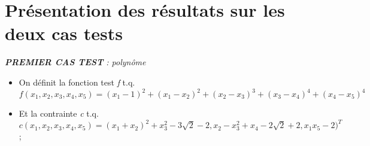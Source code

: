\section{Présentation des résultats sur les deux cas tests}

\begin{center} \emph{\textbf{PREMIER CAS TEST} : polynôme}\\\end{center}

\renewcommand{\labelitemi}{\textbullet}
\begin{itemize}
\item On définit la fonction test \textit{f} t.q.\\
$f(x_1,x_2,x_3,x_4,x_5) = (x_1-1)^2+(x_1-x_2)^2 + (x_2 - x_3)^3 + (x_3 - x_4)^4 + (x_4 - x_5)^4$\\
\item Et la contrainte \textit{c} t.q.\\
$c(x_1,x_2,x_3,x_4,x_5) =
(x_1 + x_2)^2 + x_3^2 - 3\sqrt{2} - 2 , 
x_2 - x_3^2 + x_4 - 2\sqrt{2} + 2 , 
x_{1}x_{5} - 2)^{T}$;\bigbreak
\end{itemize}

